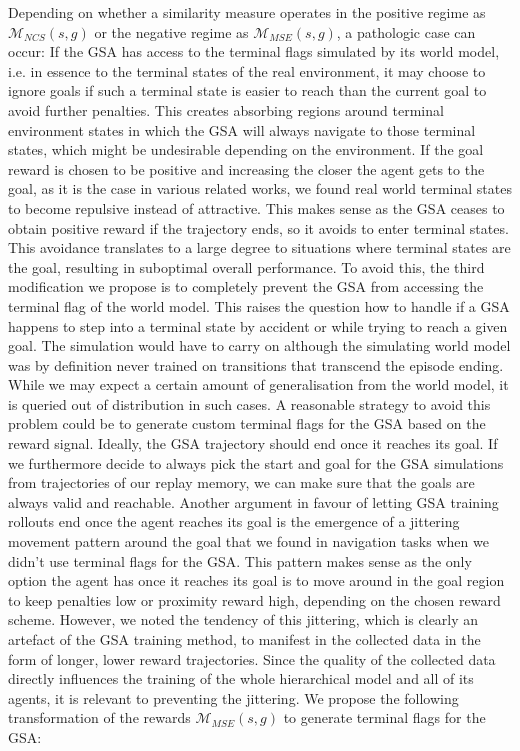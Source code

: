 \documentclass{article}
\begin{document}
Depending on whether a similarity measure operates in the positive regime as $\mathcal{M}_{NCS}(s, g)$ or the negative regime as $\mathcal{M}_{MSE}(s, g)$, a pathologic case can occur: If the GSA has access to the terminal flags simulated by its world model, i.e. in essence to the terminal states of the real environment, it may choose to ignore goals if such a terminal state is easier to reach than the current goal to avoid further penalties. This creates absorbing regions around terminal environment states in which the GSA will always navigate to those terminal states, which might be undesirable depending on the environment. If the goal reward is chosen to be positive and increasing the closer the agent gets to the goal, as it is the case in various related works, we found real world terminal states to become repulsive instead of attractive. This makes sense as the GSA ceases to obtain positive reward if the trajectory ends, so it avoids to enter terminal states. This avoidance translates to a large degree to situations where terminal states are the goal, resulting in suboptimal overall performance.
To avoid this, the third modification we propose is to completely prevent the GSA from accessing the terminal flag of the world model. This raises the question how to handle if a GSA happens to step into a terminal state by accident or while trying to reach a given goal. The simulation would have to carry on although the simulating world model was by definition never trained on transitions that transcend the episode ending. While we may expect a certain amount of generalisation from the world model, it is queried out of distribution in such cases. A reasonable strategy to avoid this problem could be to generate custom terminal flags for the GSA based on the reward signal. Ideally, the GSA trajectory should end once it reaches its goal. If we furthermore decide to always pick the start and goal for the GSA simulations from trajectories of our replay memory, we can make sure that the goals are always valid and reachable. Another argument in favour of letting GSA training rollouts end once the agent reaches its goal is the emergence of a jittering movement pattern around the goal that we found in navigation tasks when we didn't use terminal flags for the GSA. This pattern makes sense as the only option the agent has once it reaches its goal is to move around in the goal region to keep penalties low or proximity reward high, depending on the chosen reward scheme. However, we noted the tendency of this jittering, which is clearly an artefact of the GSA training method, to manifest in the collected data in the form of longer, lower reward trajectories. Since the quality of the collected data directly influences the training of the whole hierarchical model and all of its agents, it is relevant to preventing the jittering. We propose the following transformation of the rewards $\mathcal{M}_{MSE}(s, g)$ to generate terminal flags for the GSA:
\end{document}
